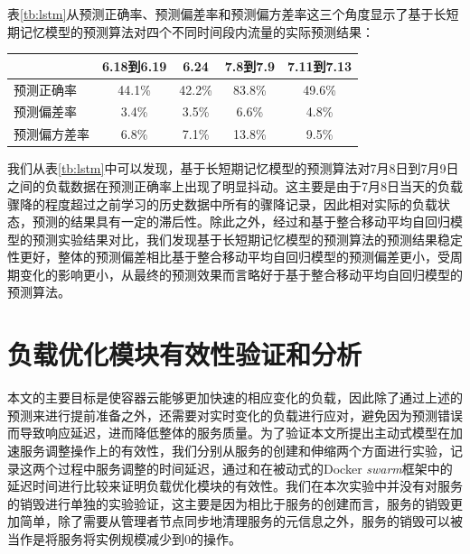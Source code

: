 表\ref{tb:lstm}从预测正确率、预测偏差率和预测偏方差率这三个角度显示了基于长短期记忆模型的预测算法对四个不同时间段内流量的实际预测结果：
\begin{table}[h]
\centering
{}
\begin{tabular}{@{}lcccc@{}}\toprule
  & 6.18到6.19 & 6.24 & 7.8到7.9 & 7.11到7.13 \\ \midrule
 预测正确率 & 44.1\% & 42.2\% & 83.8\% & 49.6\% \\
 预测偏差率 & 3.4\% & 3.5\% & 6.6\% & 4.8\% \\
 预测偏方差率 & 6.8\% & 7.1\% & 13.8\% & 9.5\% \\ \bottomrule
\end{tabular}
\end{table}

我们从表\ref{tb:lstm}中可以发现，基于长短期记忆模型的预测算法对7月8日到7月9日之间的负载数据在预测正确率上出现了明显抖动。这主要是由于7月8日当天的负载骤降的程度超过之前学习的历史数据中所有的骤降记录，因此相对实际的负载状态，预测的结果具有一定的滞后性。除此之外，经过和基于整合移动平均自回归模型的预测实验结果对比，我们发现基于长短期记忆模型的预测算法的预测结果稳定性更好，整体的预测偏差相比基于整合移动平均自回归模型的预测偏差更小，受周期变化的影响更小，从最终的预测效果而言略好于基于整合移动平均自回归模型的预测算法。

\section{负载优化模块有效性验证和分析}
本文的主要目标是使容器云能够更加快速的相应变化的负载，因此除了通过上述的预测来进行提前准备之外，还需要对实时变化的负载进行应对，避免因为预测错误而导致响应延迟，进而降低整体的服务质量。为了验证本文所提出主动式模型在加速服务调整操作上的有效性，我们分别从服务的创建和伸缩两个方面进行实验，记录这两个过程中服务调整的时间延迟，通过和在被动式的Docker \emph{swarm}框架中的延迟时间进行比较来证明负载优化模块的有效性。我们在本次实验中并没有对服务的销毁进行单独的实验验证，这主要是因为相比于服务的创建而言，服务的销毁更加简单，除了需要从管理者节点同步地清理服务的元信息之外，服务的销毁可以被当作是将服务将实例规模减少到0的操作。

